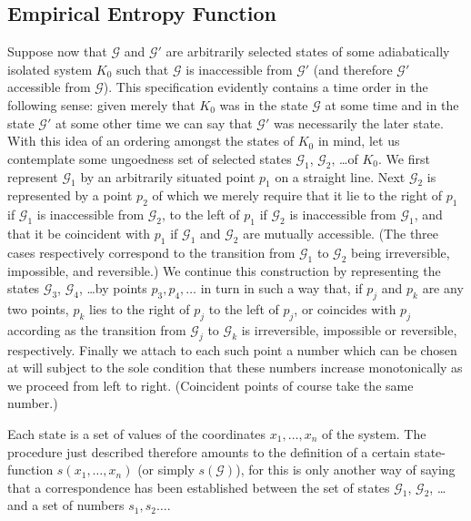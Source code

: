 \documentclass{article}
\theoremstyle{definition}
\begin{document}
\subsection{Empirical Entropy Function}
Suppose now that \(\mathcal{G}\) and \(\mathcal{G}'\) are arbitrarily selected states of some adiabatically isolated system \(K_0\) such that \(\mathcal{G}\) is inaccessible from \(\mathcal{G}'\) (and therefore \(\mathcal{G}'\) accessible from \(\mathcal{G}\)). This specification evidently contains a time order in the following sense: given merely that \(K_0\) was in the state \(\mathcal{G}\) at some time and in the state \(\mathcal{G}'\) at some other time we can say that \(\mathcal{G}'\) was necessarily the later state. With this idea of an ordering amongst the states of \(K_0\) in mind, let us contemplate some ungoedness set of selected states \(\mathcal{G}_1\), \(\mathcal{G}_2\), \ldots of \(K_0\). We first represent \(\mathcal{G}_1\) by an arbitrarily situated point \(p_1\) on a straight line. Next \(\mathcal{G}_2\) is represented by a point \(p_2\) of which we merely require that it lie to the right of \(p_1\) if \(\mathcal{G}_1\) is inaccessible from \(\mathcal{G}_2\), to the left of \(p_1\) if \(\mathcal{G}_2\) is inaccessible from \(\mathcal{G}_1\), and that it be coincident with \(p_1\) if \(\mathcal{G}_1\) and \(\mathcal{G}_2\) are mutually accessible. (The three cases respectively correspond to the transition from \(\mathcal{G}_1\) to \(\mathcal{G}_2\) being irreversible, impossible, and reversible.) We continue this construction by representing the states \(\mathcal{G}_3\), \(\mathcal{G}_4\), \ldots by points \(p_3,p_4,\ldots\) in turn in such a way that, if \(p_j\) and \(p_k\) are any two points, \(p_k\) lies to the right of \(p_j\) to the left of \(p_j\), or coincides with \(p_j\) according as the transition from \(\mathcal{G}_j\) to \(\mathcal{G}_k\) is irreversible, impossible or reversible, respectively. Finally we attach to each such point a number which can be chosen at will subject to the sole condition that these numbers increase monotonically as we proceed from left to right. (Coincident points of course take the same number.)

Each state is a set of values of the coordinates \(x_1,\ldots,x_n\) of the system. The procedure just described therefore amounts to the definition of a certain state-function \(s(x_1,\ldots,x_n)\) (or simply \(s(\mathcal{G})\)), for this is only another way of saying that a correspondence has been established between the set of states \(\mathcal{G}_1\), \(\mathcal{G}_2\), \ldots and a set of numbers \(s_{1}, s_2\ldots\).
\end{document}
